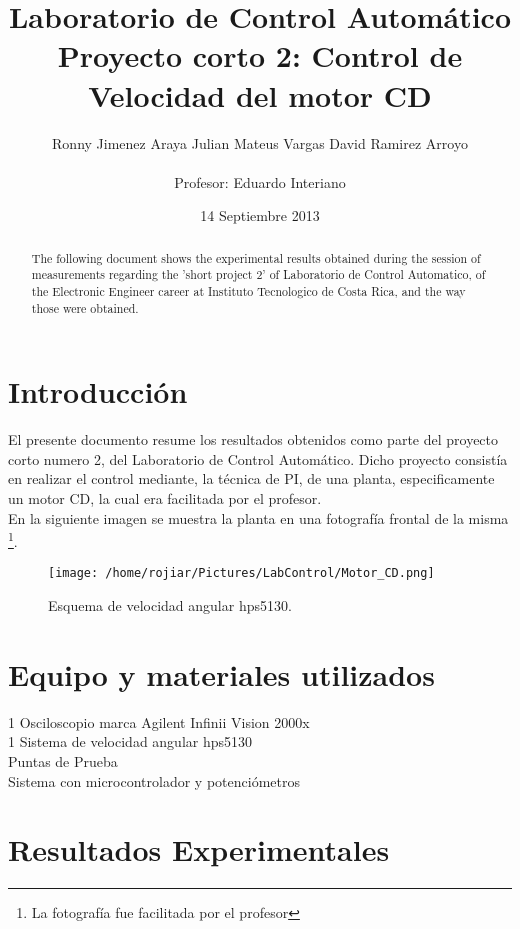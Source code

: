 \documentclass[a4paper,10pt,twocolumn]{article}
\title{\textbf{Laboratorio de Control Automático} \\ \textbf{Proyecto corto 2: Control de Velocidad del motor CD}}
\author{Ronny Jimenez Araya \hspace*{1cm} Julian Mateus Vargas \hspace*{1cm} David Ramirez Arroyo\\
\\Profesor: Eduardo Interiano}
\date{14 Septiembre 2013}
\begin{document}
\maketitle
\renewcommand{\figurename}{Figura}

\begin{abstract}

The following document shows the experimental results obtained during the session of measurements regarding the 'short project 2' 
of Laboratorio de Control Automatico, of the Electronic Engineer career at Instituto Tecnologico de Costa Rica, 
and the way those were obtained. 
\end{abstract}

\section{Introducción}

El presente documento resume los resultados obtenidos como parte del proyecto corto numero 2, del Laboratorio de Control Automático.
Dicho proyecto consistía en realizar el control mediante, la técnica de PI, de una planta, especificamente un motor CD, 
la cual era facilitada por el profesor.\\

En la siguiente imagen se muestra la planta en una fotografía frontal de la misma \footnote{La fotografía fue facilitada por el profesor}.

\begin{figure}[h!]
\centering
\texttt{[image: /home/rojiar/Pictures/LabControl/Motor\_CD.png]}
\caption{Esquema de velocidad angular hps5130.}
\label{Esquema de velocidad angular hps5130}
\end{figure}

\section{Equipo y materiales utilizados}

1 Osciloscopio marca Agilent Infinii Vision 2000x
\\1 Sistema de velocidad angular hps5130
\\Puntas de Prueba
\\Sistema con microcontrolador y potenciómetros


\section{Resultados Experimentales}
\end{document}
